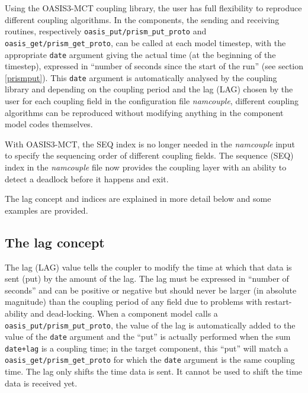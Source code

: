 Using the OASIS3-MCT coupling library, the user has full flexibility to reproduce
different coupling algorithms. In the components, the sending and
receiving routines, respectively {\tt oasis\_put/prism\_put\_proto} and {\tt
   oasis\_get/prism\_get\_proto}, can be called at each model timestep, with the
appropriate {\tt date} argument giving the actual time (at the
beginning of the timestep), expressed in ``number of seconds since the
start of the run'' (see section \ref{prismput}). This {\tt date} argument is automatically analysed
by the coupling library
and depending on the coupling period and the lag (LAG) chosen by the 
user for each coupling field in the configuration file {\it namcouple}, different
coupling algorithms can be reproduced without modifying anything in the
component model codes themselves. 

With OASIS3-MCT, the SEQ index is no longer needed in the {\it namcouple}
input to specify the sequencing order of different coupling fields.
The sequence (SEQ) index in the {\it namcouple} file now provides the coupling 
layer with an ability to detect a deadlock before it happens and exit.

The lag concept and indices are explained in more detail below and some
examples are provided.

\vspace{-0.3cm}
\subsection{The lag concept}
\label{subsub_lag}

The lag (LAG) value tells the coupler to modify the time at which that data
is sent (put) by the amount of the lag.  The lag must be
expressed in ``number of seconds'' and can be positive or
negative but should never be larger (in absolute magnitude) than the
coupling period of any field due to problems with restart-ability and
dead-locking. When a component model calls a {\tt oasis\_put/prism\_put\_proto}, the value of the lag is automatically added to the value of the {\tt date} argument and the ``put'' is actually performed when the sum {\tt date+lag} is a coupling time; in the target component, this ``put'' will match a {\tt oasis\_get/prism\_get\_proto} for which the {\tt date} argument is the same coupling time.
The lag only shifts the time data is sent.  It cannot be used to shift the time data is received yet.
 
